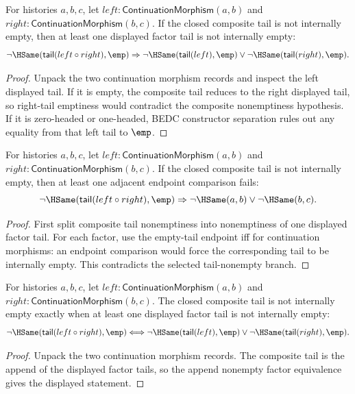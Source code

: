 \begin{theorem}
\label{thm:category-continuation-morphism-comp-tail-nonempty-cases}
For histories $a,b,c$, let
$left:\mathsf{ContinuationMorphism}(a,b)$ and
$right:\mathsf{ContinuationMorphism}(b,c)$. If the closed composite tail is
not internally empty, then at least one displayed factor tail is not internally
empty:
$$
\neg\HSame(\mathsf{tail}(left\circ right),\emp)
\Rightarrow
\neg\HSame(\mathsf{tail}(left),\emp)\vee
\neg\HSame(\mathsf{tail}(right),\emp).
$$
\end{theorem}
\begin{proof}
Unpack the two continuation morphism records and inspect the left displayed
tail. If it is empty, the composite tail reduces to the right displayed tail,
so right-tail emptiness would contradict the composite nonemptiness
hypothesis. If it is zero-headed or one-headed, BEDC constructor separation
rules out any equality from that left tail to $\emp$.
\end{proof}

\begin{theorem}
\label{thm:continuation-morphism-comp-tail-nonempty-endpoint-cases}
For histories $a,b,c$, let
$left:\mathsf{ContinuationMorphism}(a,b)$ and
$right:\mathsf{ContinuationMorphism}(b,c)$. If the closed composite tail is
not internally empty, then at least one adjacent endpoint comparison fails:
$$
\neg\HSame(\mathsf{tail}(left\circ right),\emp)
\Rightarrow
\neg\HSame(a,b)\vee\neg\HSame(b,c).
$$
\end{theorem}
\begin{proof}
First split composite tail nonemptiness into nonemptiness of one displayed
factor tail. For each factor, use the empty-tail endpoint iff for continuation
morphisms: an endpoint comparison would force the corresponding tail to be
internally empty. This contradicts the selected tail-nonempty branch.
\end{proof}

\begin{theorem}
\label{thm:continuation-morphism-comp-tail-nonempty-iff}
For histories $a,b,c$, let
$left:\mathsf{ContinuationMorphism}(a,b)$ and
$right:\mathsf{ContinuationMorphism}(b,c)$. The closed composite tail is not
internally empty exactly when at least one displayed factor tail is not
internally empty:
$$
\neg\HSame(\mathsf{tail}(left\circ right),\emp)
\Longleftrightarrow
\neg\HSame(\mathsf{tail}(left),\emp)\vee
\neg\HSame(\mathsf{tail}(right),\emp).
$$
\end{theorem}
\begin{proof}
Unpack the two continuation morphism records. The composite tail is the append
of the displayed factor tails, so the append nonempty factor equivalence gives
the displayed statement.
\end{proof}

